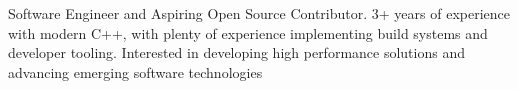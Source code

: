 

\begin{cvparagraph}

Software Engineer and Aspiring Open Source Contributor.
3+ years of experience with modern C++, with plenty of experience implementing build systems and developer tooling.
Interested in developing high performance solutions and advancing emerging software technologies
\end{cvparagraph}
